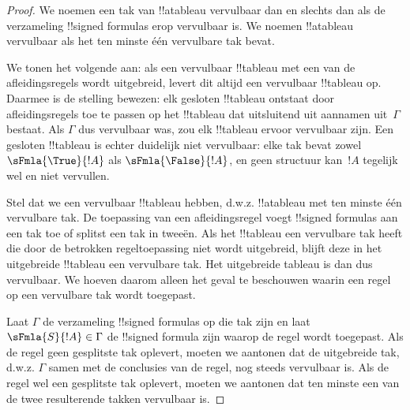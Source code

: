 \documentclass[openany]{memoir}
\begin{document}
\begin{proof}
We noemen een tak van !!a{tableau} vervulbaar dan en slechts dan als
de verzameling !!{signed formula}s erop vervulbaar is. We noemen
!!a{tableau} vervulbaar als het ten minste één vervulbare tak bevat.

We tonen het volgende aan: als een vervulbaar !!{tableau} met een van
de afleidingsregels wordt uitgebreid, levert dit altijd een
vervulbaar !!{tableau} op. Daarmee is de stelling bewezen: elk gesloten
!!{tableau} ontstaat door afleidingsregels toe te passen op het
!!{tableau} dat uitsluitend uit aannamen uit~$\Gamma$ bestaat. Als
$\Gamma$ dus vervulbaar was, zou elk !!{tableau} ervoor vervulbaar
zijn. Een gesloten !!{tableau} is echter duidelijk niet vervulbaar:
elke tak bevat zowel $\sFmla{\True}{!A}$ als
$\sFmla{\False}{!A}$, en geen structuur kan~$!A$ tegelijk wel en niet
vervullen.

Stel dat we een vervulbaar !!{tableau} hebben, d.w.z. !!a{tableau} met
ten minste één vervulbare tak. De toepassing van een afleidingsregel
voegt !!{signed formula}s aan een tak toe of splitst een tak in tweeën.
Als het !!{tableau} een vervulbare tak heeft die door de betrokken
regeltoepassing niet wordt uitgebreid, blijft deze in het uitgebreide
!!{tableau} een vervulbare tak. Het uitgebreide tableau is dan dus
vervulbaar. We hoeven daarom alleen het geval te beschouwen waarin een
regel op een vervulbare tak wordt toegepast.

Laat $\Gamma$ de verzameling !!{signed formula}s op die tak zijn en
laat $\sFmla{S}{!A} \in \Gamma$ de !!{signed formula} zijn waarop de
regel wordt toegepast. Als de regel geen gesplitste tak oplevert,
moeten we aantonen dat de uitgebreide tak, d.w.z. $\Gamma$ samen met
de conclusies van de regel, nog steeds vervulbaar is. Als de regel wel
een gesplitste tak oplevert, moeten we aantonen dat ten minste een van
de twee resulterende takken vervulbaar is.
  

\end{proof}
\end{document}
